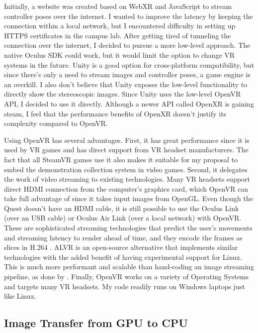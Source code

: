 Initially, a website was created based on WebXR and JavaScript to stream controller poses over the internet. I wanted to improve the latency by keeping the connection within a local network, but I encountered difficulty in setting up HTTPS certificates in the campus lab. After getting tired of tunneling the connection over the internet, I decided to pursue a more low-level approach. 
The native Oculus SDK could work, but it would limit the option to change VR systems in the future. Unity is a good option for cross-platform compatibility, but since there's only a need to stream images and controller poses, a game engine is an overkill. I also don't believe that Unity exposes the low-level functionality to directly show the stereoscopic images. Since Unity uses the low-level OpenVR API, I decided to use it directly. Although a newer API called OpenXR is gaining steam, I feel that the performance benefits of OpenXR doesn't justify its complexity compared to OpenVR. 

Using OpenVR has several advantages. First, it has great performance since it is used by VR games and has direct support from VR headset manufacturers. The fact that all SteamVR games use it also makes it suitable for my proposal to embed the demonstration collection system in video games. Second, it delegates the work of video streaming to existing technologies. Many VR headsets support direct HDMI connection from the computer's graphics card, which OpenVR can take full advantage of since it takes input images from OpenGL. Even though the Quest doesn't have an HDMI cable, it is still possible to use the Oculus Link (over an USB cable) or Oculus Air Link (over a local network) with OpenVR. These are sophisticated streaming technologies that predict the user's movements and streaming latency to render ahead of time, and they encode the frames as slices in H.264 \cite{air-link}. ALVR is an open-source alternative that implements similar technologies with the added benefit of having experimental support for Linux. This is much more performant and scalable than hand-coding an image streaming pipeline, as done by \cite{arunachalam2022holodex}. Finally, OpenVR works on a variety of Operating Systems and targets many VR headsets. My code readily runs on Windows laptops just like Linux.

\subsection{Image Transfer from GPU to CPU}


